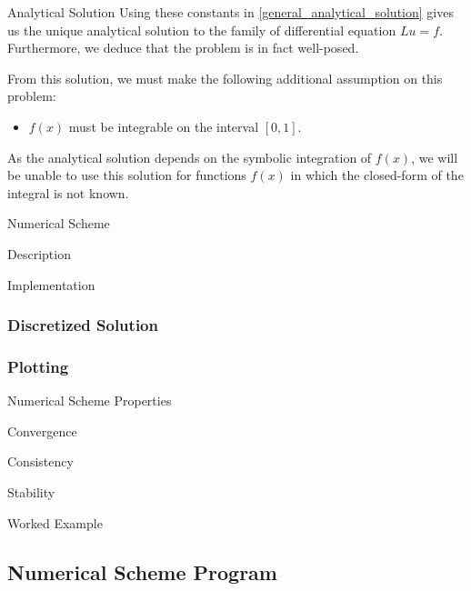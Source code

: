 \documentclass{article}
\begin{document}
\begin{section}{Analytical Solution}
  Using these constants in \eqref{general_analytical_solution} gives us the
  unique analytical solution to the family of differential equation $Lu = f$.
  Furthermore, we deduce that the problem is in fact well-posed.

  From this solution, we must make the following additional assumption on this
  problem:
  \begin{itemize}
    \item $f(x)$ must be integrable on the interval $[0, 1]$.
  \end{itemize}
  As the analytical solution depends on the symbolic integration of $f(x)$, we
  will be unable to use this solution for functions $f(x)$ in which the
  closed-form of the integral is not known.
\end{section}


\begin{section}{Numerical Scheme}

  \begin{subsection}{Description}
  \end{subsection}

  \begin{subsection}{Implementation}

    \subsubsection{Discretized Solution}

    \subsubsection{Plotting}

  \end{subsection}

\end{section}


\begin{section}{Numerical Scheme Properties}

  \begin{subsection}{Convergence}
  \end{subsection}

  \begin{subsection}{Consistency}
  \end{subsection}

  \begin{subsection}{Stability}
  \end{subsection}

\end{section}


\begin{section}{Worked Example}
\end{section}


\newpage
\begin{appendices}
  \section{Numerical Scheme Program}
\end{appendices}
\end{document}
